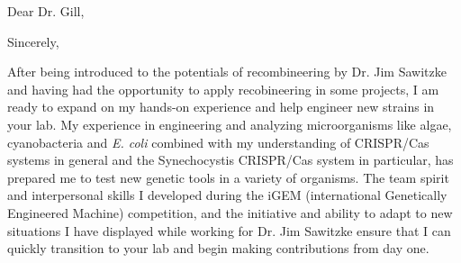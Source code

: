 \documentclass[11pt,a4paper,sans]{moderncv}
\begin{document}
\thispagestyle{titlepage}
\date{\today}
\opening{Dear Dr. Gill,}
\closing{Sincerely,}
\makelettertitle
\begin{spacing}{1.1}

After being introduced to the potentials of recombineering by Dr. Jim Sawitzke and having had the opportunity to apply recobineering in some projects, I am ready to expand on my hands-on experience and help engineer new strains in your lab. %
My experience in engineering and analyzing microorganisms like algae, cyanobacteria and \textit{E. coli} combined with my understanding of CRISPR/Cas systems in general and the Synechocystis CRISPR/Cas system in particular, has prepared me to test new genetic tools in a variety of organisms.
The team spirit and interpersonal skills I developed during the iGEM (international Genetically Engineered Machine) competition, and the initiative and ability to adapt to new situations I have displayed while working for Dr. Jim Sawitzke ensure that I can quickly transition to your lab and begin making contributions from day one.\par\vspace*{3mm}


\end{spacing}
\end{document}
